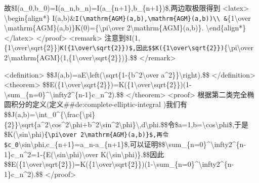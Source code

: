 \documentclass[
]{article}
\begin{document}
故\$I(a\_0,b\_0)=I(a\_n,b\_n)=I(a\_\{n+1\},b\_\{n+1\})\$,两边取极限得到
\textless latex\textgreater{} \textbackslash begin\{align*\}
I(a,b)\&\texttt{I(\textbackslash{}mathrm\{AGM\}(a,b),\textbackslash{}mathrm\{AGM\}(a,b))\textbackslash{}\textbackslash{}
\&}\{1\textbackslash over
\textbackslash mathrm\{AGM\}(a,b)\}K(0)=\{\textbackslash pi\textbackslash over
2\textbackslash mathrm\{AGM\}(a,b)\}. \textbackslash end\{align*\}
\textless/latex\textgreater{} \textless/proof\textgreater{}
\textless remark\textgreater{}
注意到\$I(1,\{1\textbackslash over\textbackslash sqrt\{2\}\})\texttt{K(\{1\textbackslash{}over\textbackslash{}sqrt\{2\}\})\$,因此\$\$K(\{1\textbackslash{}over\textbackslash{}sqrt\{2\}\})}\{\textbackslash pi\textbackslash over
2\textbackslash mathrm\{AGM\}(1,\{1\textbackslash over\textbackslash sqrt\{2\}\})\}.\$\$
\textless/remark\textgreater{}

\textless definition\textgreater{}
\$\$J(a,b)=aE\textbackslash left(\textbackslash sqrt\{1-\{b\^{}2\textbackslash over
a\^{}2\}\}\textbackslash right).\$\$ \textless/definition\textgreater{}
\textless theorem\textgreater{}
\$\$E(\{1\textbackslash over\textbackslash sqrt\{2\}\})=K(\{1\textbackslash over\textbackslash sqrt\{2\}\})(1-\textbackslash sum\_\{n=0\}\^{}\textbackslash infty2\^{}\{n-1\}c\_n\^{}2).\$\$
\textless/theorem\textgreater{} \textless proof\textgreater{}
根据第二类完全椭圆积分的定义(定义\#\#de:complete-elliptic-integral
)我们有\$\$J(a,b)=\textbackslash int\_0\^{}\{\textbackslash frac\{\textbackslash pi\}\{2\}\}\textbackslash sqrt\{a\^{}2\textbackslash cos\^{}2\textbackslash phi+b\^{}2\textbackslash sin\^{}2\textbackslash phi\}\textbackslash,d\textbackslash phi.\$\$令\$a=1,b=\textbackslash cos\textbackslash phi\$,于是\$K(\textbackslash sin\textbackslash phi)\texttt{\{\textbackslash{}pi\textbackslash{}over\ 2\textbackslash{}mathrm\{AGM\}(a,b)\}\$,再令\$c\_0}\textbackslash sin\textbackslash phi,c\_\{n+1\}=a\_n-a\_\{n+1\}\$,可以证明\$\$\textbackslash sum\_\{n=0\}\^{}\textbackslash infty2\^{}\{n-1\}c\_n\^{}2=1-\{E(\textbackslash sin\textbackslash phi)\textbackslash over
K(\textbackslash sin\textbackslash phi)\}.\$\$因此\$\$E(\{1\textbackslash over\textbackslash sqrt\{2\}\})=K(\{1\textbackslash over\textbackslash sqrt\{2\}\})(1-\textbackslash sum\_\{n=0\}\^{}\textbackslash infty2\^{}\{n-1\}c\_n\^{}2).\$\$
\textless/proof\textgreater{}
\end{document}
